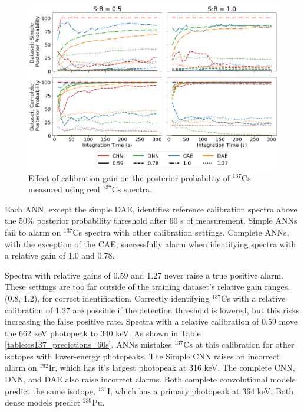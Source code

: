 \begin{figure}[H]
	\centering
	\includegraphics[width=1.0\linewidth]{images/realspectra-cal-cs137}
	\caption{Effect of calibration gain on the posterior probability of $^{137}$Cs measured using real $^{137}$Cs spectra.}
	\label{fig:realspectra-cal-cs137}
\end{figure}

Each ANN, except the simple DAE, identifies reference calibration spectra above the 50\% posterior probability threshold after 60 s of measurement. Simple ANNs fail to alarm on $^{137}$Cs spectra with other calibration settings. Complete ANNs, with the exception of the CAE, successfully alarm when identifying spectra with a relative gain of 1.0 and 0.78.

Spectra with relative gains of 0.59 and 1.27 never raise a true positive alarm. These settings are too far outside of the training dataset's relative gain ranges, (0.8, 1.2), for correct identification. Correctly identifying $^{137}$Cs with a relative calibration of 1.27 are possible if the detection threshold is lowered, but this risks increasing the false positive rate. Spectra with a relative calibration of 0.59 move the 662 keV photopeak to 340 keV. As shown in Table \ref{table:cs137_precictions_60s}, ANNs mistakes $^{137}$Cs at this calibration for other isotopes with lower-energy photopeaks. The Simple CNN raises an incorrect alarm on $^{192}$Ir, which has it's largest photopeak at 316 keV. The complete CNN, DNN, and DAE also raise incorrect alarms. Both complete convolutional models predict the same isotope, $^{131}$I, which has a primary photopeak at 364 keV. Both dense models predict $^{239}$Pu.

